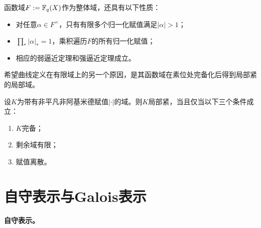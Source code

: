 函数域$F:=\mathbb{F}_q(X)$作为整体域，还具有以下性质：
\begin{itemize}
\item 对任意$\alpha\in F^\times$，只有有限多个归一化赋值满足$|\alpha|>1$；
\item $\prod_*|\alpha|_*=1$，乘积遍历$F$的所有归一化赋值；
\item 相应的弱逼近定理和强逼近定理成立。
\end{itemize}
希望曲线定义在有限域上的另一个原因，是其函数域在素位处完备化后得到局部紧的局部域。
\begin{theorem}\label{L9S1O7}
设$K$为带有非平凡非阿基米德赋值$|\cdot|$的域。则$K$局部紧，当且仅当以下三个条件成立：
\begin{enumerate}\item $K$完备；\item 剩余域有限；\item 赋值离散。\end{enumerate}
\end{theorem}
\section{自守表示与Galois表示}\label{L9S2}
\textbf{自守表示。}

